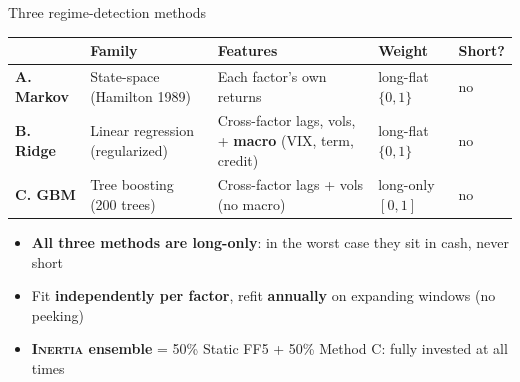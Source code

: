 \documentclass[aspectratio=169, 12pt]{beamer}
\newcommand{\fundname}{\textsc{Inertia}}
\newcommand{\emphp}[1]{{\color{inertiapurple}\textbf{#1}}}
\begin{document}
\begin{frame}{Three regime-detection methods}
  \vspace{2pt}
  \begin{center}
  \scriptsize
  \begin{tabular}{@{}p{} p{} p{} p{} p{}@{}}
    \toprule
     & \textbf{Family} & \textbf{Features} & \textbf{Weight} & \textbf{Short?} \\
    \midrule
    \emphp{A. Markov} & State-space (Hamilton 1989) & Each factor's own returns & long-flat $\{0, 1\}$ & no \\[3pt]
    \emphp{B. Ridge}  & Linear regression (regularized) & Cross-factor lags, vols, + \emphp{macro} (VIX, term, credit) & long-flat $\{0, 1\}$ & no \\[3pt]
    \emphp{C. GBM}    & Tree boosting (200 trees) & Cross-factor lags + vols (no macro) & long-only $[0, 1]$ & no \\
    \bottomrule
  \end{tabular}
  \end{center}
  \vspace{8pt}
  \begin{itemize}\setlength{\itemsep}{2pt}\footnotesize
    \item \emphp{All three methods are long-only}: in the worst case they sit in cash, never short
    \item Fit \textbf{independently per factor}, refit \textbf{annually} on expanding windows (no peeking)
    \item \emphp{\fundname{} ensemble} = 50\% Static FF5 + 50\% Method C: fully invested at all times
  \end{itemize}
  \vspace{6pt}
\end{frame}
\end{document}
